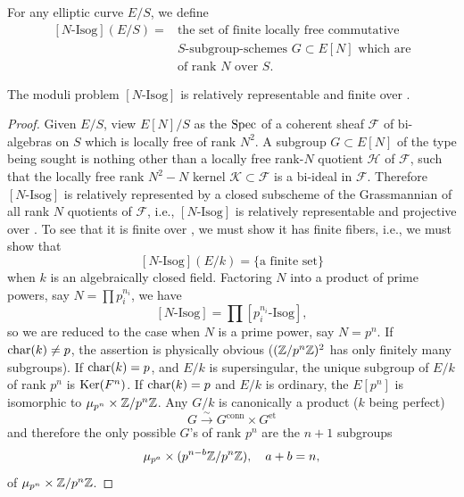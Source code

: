 For any elliptic curve $E/S$, we define
\[
\begin{aligned}
[N\text{-Isog}](E/S) = {} & \text{the set of finite locally free commutative} \\
& S\text{-subgroup-schemes } G \subset E[N] \text{ which are} \\
& \text{of rank } N \text{ over } S.
\end{aligned}
\]

\begin{kprop}\label{prop:6.5.1}
The moduli problem $[N\text{-Isog}]$ is relatively representable and finite over \Ell.
\end{kprop}

\begin{proof}
Given $E/S$, view $E[N]/S$ as the $\operatorname{Spec}$ of a coherent sheaf $\mathcal{F}$ of bi-algebras on $S$ which is locally free of rank $N^2$. A subgroup $G \subset E[N]$ of the type being sought is nothing other than a locally free rank-$N$ quotient $\mathcal{H}$ of $\mathcal{F}$, such that the locally free rank $N^2-N$ kernel $\mathcal{K} \subset \mathcal{F}$ is a bi-ideal in $\mathcal{F}$. Therefore $[N\text{-Isog}]$ is relatively represented by a closed subscheme of the Grassmannian of all rank $N$ quotients of $\mathcal{F}$, i.e., $[N\text{-Isog}]$ is relatively representable and projective over \Ell. To see that it is finite over \Ell, we must show it has finite fibers, i.e., we must show that
\[
[N\text{-Isog}](E/k) = \{\text{a finite set}\}
\]
when $k$ is an algebraically closed field. Factoring $N$ into a product of prime powers, say $N = \prod p_i^{n_i}$, we have
\[
[N\text{-Isog}] = \prod [p_i^{n_i}\text{-Isog}],
\]
so we are reduced to the case when $N$ is a prime power, say $N = p^n$. If $\operatorname{char}(k) \ne p$, the assertion is physically obvious ($(\mathbb{Z}/p^n\mathbb{Z})^2$ has only finitely many subgroups). If $\operatorname{char}(k) = p$, and $E/k$ is supersingular, the unique subgroup of $E/k$ of rank $p^n$ is $\operatorname{Ker}(F^n)$. If $\operatorname{char}(k) = p$ and $E/k$ is ordinary, the $E[p^n]$ is isomorphic to $\mu_{p^n} \times \mathbb{Z}/p^n\mathbb{Z}$. Any $G/k$ is canonically a product ($k$ being perfect)
\[
G \xrightarrow{\ \sim\ } G^{\mathrm{conn}} \times G^{\mathrm{et}}
\]
and therefore the only possible $G$'s of rank $p^n$ are the $n+1$ subgroups
\[
\mu_{p^a} \times (p^{n-b}\mathbb{Z}/p^n\mathbb{Z}), \quad a+b = n,
\]
of $\mu_{p^n} \times \mathbb{Z}/p^n\mathbb{Z}$.
\end{proof}

